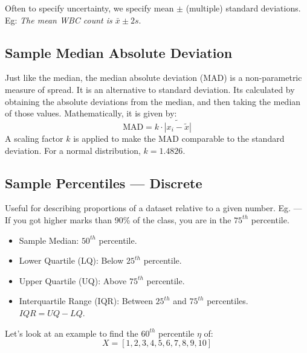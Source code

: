 \documentclass[letterpaper,12pt]{article}
\begin{document}
Often to specify uncertainty, we specify mean $\pm$ (multiple) standard deviations. Eg: \textit{The mean WBC count is $\bar{x} \pm 2s$}.

\subsection{Sample Median Absolute Deviation}
Just like the median, the median absolute deviation (MAD) is a non-parametric measure of spread. It is an alternative to standard deviation. Its calculated by obtaining the absolute deviations from the median, and then taking the median of those values. Mathematically, it is given by:
\begin{equation}
	\text{MAD} = k \cdot\widetilde{|x_i - \tilde{x}|}
\end{equation}
A scaling factor $k$ is applied to make the MAD comparable to the standard deviation. For a normal distribution, $k = 1.4826$.

\subsection{Sample Percentiles --- Discrete}
Useful for describing proportions of a dataset relative to a given number. Eg. --- If you got higher marks than 90\% of the class, you are in the $75^{th}$ percentile.

\begin{itemize}
	\item Sample Median: $50^{th}$ percentile.
	\item Lower Quartile (LQ): Below $25^{th}$ percentile.
	\item Upper Quartile (UQ): Above $75^{th}$ percentile.
	\item Interquartile Range (IQR): Between $25^{th}$ and $75^{th}$ percentiles. $IQR = UQ - LQ$.
\end{itemize}

Let's look at an example to find the $60^{th}$ percentile $\eta$ of:
\[X = [1, 2, 3, 4, 5, 6, 7, 8, 9, 10]\]

\end{document}

